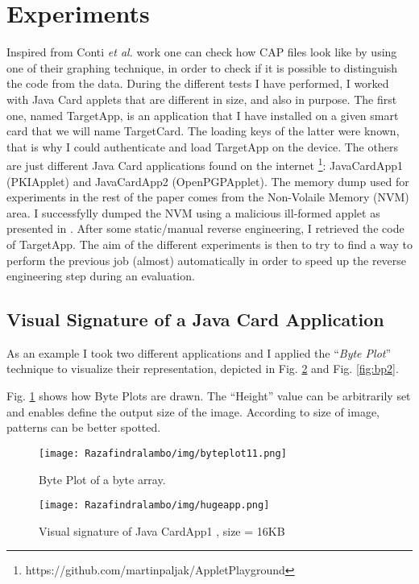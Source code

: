 \section{Experiments}
\label{section:exp}
Inspired from Conti \textit{et al.} work \cite{Conti:2008:VRE:1431913.1431914} one can check how CAP
files look like by using one of their graphing technique, in order to check if it is possible to
distinguish the code from the data. During the different tests I have
performed, I worked with Java Card applets that are different in size, and also
in purpose. The first one, named TargetApp, is an application that I have
installed on a given smart card that we will name TargetCard. The loading keys
of the latter were known, that is why I could authenticate and load TargetApp
on the device. The others are just different Java Card applications found on the
internet \footnote{https://github.com/martinpaljak/AppletPlayground}:
JavaCardApp1 (PKIApplet) and JavaCardApp2 (OpenPGPApplet).  The memory dump
used for experiments in the rest of the paper comes from the Non-Volaile Memory
(NVM) area. I successfylly dumped the NVM using a malicious ill-formed applet
as presented in \cite{cardis15}. After some static/manual reverse engineering,
I retrieved the code of TargetApp. The aim of the different experiments is then
to try to find a way to perform the previous job (almost)
automatically in order to speed up the reverse engineering step during an evaluation.




\subsection{Visual Signature of a Java Card Application}

As an example I took two different applications and I applied the ``\textit{Byte
Plot}'' technique to visualize their representation, depicted in Fig. \ref{fig:bp1} and Fig. \ref{fig:bp2}.

Fig. \ref{fig:byteplot11} shows how Byte Plots are drawn. The ``Height'' value can be
arbitrarily set and enables define the output size of the image. According to size of image,
patterns can be better spotted. 
\begin{figure}[!h]
\center
    \texttt{[image: Razafindralambo/img/byteplot11.png]}
    \caption{Byte Plot of a byte array.}
    \label{fig:byteplot11}
\end{figure}

\begin{figure}[!h]
    \texttt{[image: Razafindralambo/img/hugeapp.png]}
    \caption{Visual signature of Java CardApp1 , size = 16KB}
    \label{fig:bp1}
\end{figure}


